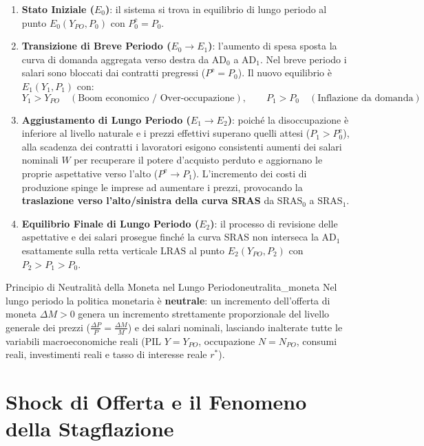 \begin{enumerate}
    \item \textbf{Stato Iniziale ($E_0$)}: il sistema si trova in equilibrio di lungo periodo al punto $E_0(Y_{PO}, P_0)$ con $P_0^{\mathrm{e}} = P_0$.
    \item \textbf{Transizione di Breve Periodo ($E_0 \to E_1$)}: l'aumento di spesa sposta la curva di domanda aggregata verso destra da $\mathrm{AD}_0$ a $\mathrm{AD}_1$. Nel breve periodo i salari sono bloccati dai contratti pregressi ($P^{\mathrm{e}} = P_0$). Il nuovo equilibrio è $E_1(Y_1, P_1)$ con:
    \begin{equation}
        Y_1 > Y_{PO} \quad (\text{Boom economico / Over-occupazione}), \qquad P_1 > P_0 \quad (\text{Inflazione da domanda})
    \end{equation}
    \item \textbf{Aggiustamento di Lungo Periodo ($E_1 \to E_2$)}: poiché la disoccupazione è inferiore al livello naturale e i prezzi effettivi superano quelli attesi ($P_1 > P_0^{\mathrm{e}}$), alla scadenza dei contratti i lavoratori esigono consistenti aumenti dei salari nominali $W$ per recuperare il potere d'acquisto perduto e aggiornano le proprie aspettative verso l'alto ($P^{\mathrm{e}} \to P_1$). L'incremento dei costi di produzione spinge le imprese ad aumentare i prezzi, provocando la \textbf{traslazione verso l'alto/sinistra della curva SRAS} da $\mathrm{SRAS}_0$ a $\mathrm{SRAS}_1$.
    \item \textbf{Equilibrio Finale di Lungo Periodo ($E_2$)}: il processo di revisione delle aspettative e dei salari prosegue finché la curva SRAS non interseca la $\mathrm{AD}_1$ esattamente sulla retta verticale $\mathrm{LRAS}$ al punto $E_2(Y_{PO}, P_2)$ con $P_2 > P_1 > P_0$.
\end{enumerate}

\begin{teorema}{Principio di Neutralità della Moneta nel Lungo Periodo}{neutralita_moneta}
Nel lungo periodo la politica monetaria è \textbf{neutrale}: un incremento dell'offerta di moneta $\Delta M > 0$ genera un incremento strettamente proporzionale del livello generale dei prezzi ($\frac{\Delta P}{P} = \frac{\Delta M}{M}$) e dei salari nominali, lasciando inalterate tutte le variabili macroeconomiche reali (PIL $Y = Y_{PO}$, occupazione $N = N_{PO}$, consumi reali, investimenti reali e tasso di interesse reale $r^*$).
\end{teorema}

\section{Shock di Offerta e il Fenomeno della Stagflazione}

